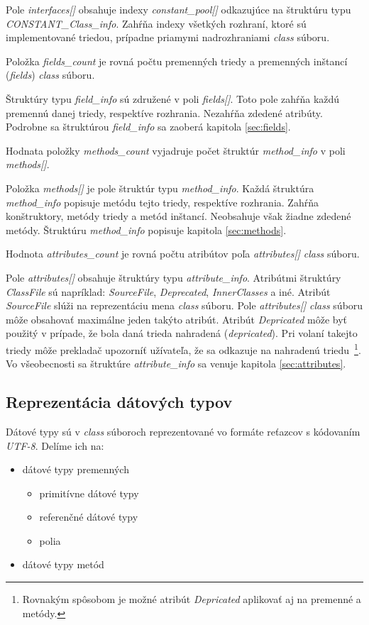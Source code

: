 \documentclass[11pt,final,oneside]{fithesis}
\begin{document}
Pole \textit{interfaces[]} obsahuje indexy \textit{constant\_pool[]}
odkazujúce na štruktúru typu \textit{CONSTANT\_Class\_info}. Zahŕňa indexy
všetkých rozhraní, ktoré sú implementované triedou, prípadne priamymi
nadrozhraniami \textit{class} súboru.

Položka \textit{fields\_count} je rovná počtu premenných triedy a premenných
inštancí (\textit{fields}) \textit{class} súboru.

Štruktúry typu \textit{field\_info} sú združené v poli \textit{fields[]}. Toto
pole zahŕňa každú premennú danej triedy, respektíve rozhrania. Nezahŕňa
zdedené atribúty. Podrobne sa štruktúrou \textit{field\_info} sa zaoberá
kapitola \ref{sec:fields}.

Hodnata položky \textit{methods\_count} vyjadruje počet štruktúr
\textit{method\_info} v poli \textit{methods[]}.

Položka \textit{methods[]} je pole štruktúr typu \textit{method\_info}. Každá
štruktúra \textit{method\_info} popisuje metódu tejto triedy, respektíve
rozhrania. Zahŕňa konštruktory, metódy triedy a
metód inštancí. Neobsahuje však žiadne zdedené metódy. Štruktúru
\textit{method\_info} popisuje kapitola \ref{sec:methods}.

Hodnota \textit{attributes\_count} je rovná počtu atribútov poľa
\textit{attributes[]} \textit{class} súboru.

Pole \textit{attributes[]} obsahuje štruktúry typu \textit{attribute\_info}.
Atribútmi štruktúry \textit{ClassFile} sú napríklad: \textit{SourceFile},
\textit{Deprecated}, \textit{InnerClasses} a iné. Atribút \textit{SourceFile} 
slúži na reprezentáciu mena \textit{class} súboru. Pole \textit{attributes[]}
\textit{class} súboru môže obsahovať maximálne jeden takýto atribút. Atribút
\textit{Depricated} môže byť použitý v prípade, že bola daná trieda nahradená
(\textit{depricated}). Pri volaní takejto triedy môže prekladač upozorníť 
užívateľa, že sa odkazuje na nahradenú triedu~\footnote{Rovnakým spôsobom je
možné atribút \textit{Depricated} aplikovať aj na premenné a metódy.}. Vo
všeobecnosti sa štruktúre \textit{attribute\_info} sa venuje
kapitola \ref{sec:attributes}.

\subsection{Reprezentácia dátových typov}
\label{sec:descriptors}
Dátové typy sú v \textit{class} súboroch reprezentované vo formáte reťazcov
s kódovaním \textit{UTF-8}. Delíme ich na:
\begin{itemize}
\item dátové typy premenných
\begin{itemize}
\item primitívne dátové typy
\item referenčné dátové typy
\item polia
\end{itemize}
\item dátové typy metód
\end{itemize}
\end{document}
